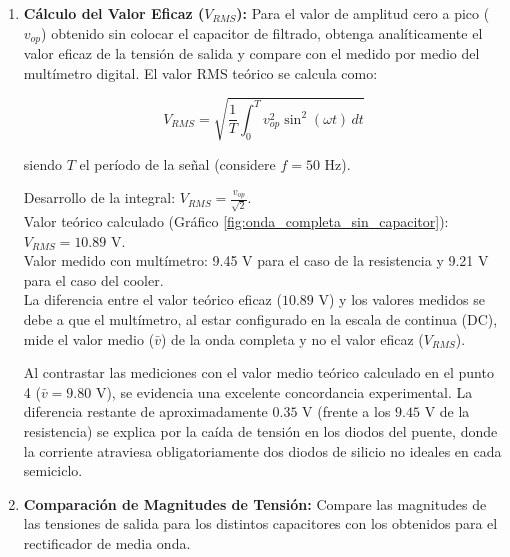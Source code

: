 \begin{enumerate}
    \item \textbf{Cálculo del Valor Eficaz ($V_{RMS}$):}
    Para el valor de amplitud cero a pico ($v_{op}$) obtenido sin colocar el capacitor de filtrado, obtenga analíticamente el valor eficaz de la tensión de salida y compare con el medido por medio del multímetro digital. El valor RMS teórico se calcula como:
    
    \[ V_{RMS} = \sqrt{\frac{1}{T} \int_{0}^{T} v_{op}^2 \sin^2(\omega t) \, dt} \]
    
    siendo $T$ el período de la señal (considere $f = 50\text{ Hz}$).
    
    \begin{tcolorbox}[colback=white, colframe=gray!50, title=Respuesta]
        Desarrollo de la integral: $V_{RMS} = \frac{v_{op}}{\sqrt{2}}$. \\
        Valor teórico calculado (Gráfico \ref{fig:onda_completa_sin_capacitor}): $V_{RMS} = \text{10.89 V}$. \\
        Valor medido con multímetro: {9.45 V} para el caso de la resistencia y {9.21 V} para el caso del cooler. \\
        
        La diferencia entre el valor teórico eficaz ($10.89\text{ V}$) y los valores medidos se debe a que el multímetro, al estar configurado en la {escala de continua (DC)}, mide el {valor medio} ($\bar{v}$) de la onda completa y no el valor eficaz ($V_{RMS}$). 
        
        Al contrastar las mediciones con el valor medio teórico calculado en el punto 4 ($\bar{v} = 9.80\text{ V}$), se evidencia una excelente concordancia experimental. La diferencia restante de aproximadamente $0.35\text{ V}$ (frente a los $9.45\text{ V}$ de la resistencia) se explica por la caída de tensión en los diodos del puente, donde la corriente atraviesa obligatoriamente dos diodos de silicio no ideales en cada semiciclo.
    \end{tcolorbox}
    \item \textbf{Comparación de Magnitudes de Tensión:}
    Compare las magnitudes de las tensiones de salida para los distintos capacitores con los obtenidos para el rectificador de media onda.
    

\end{enumerate}
